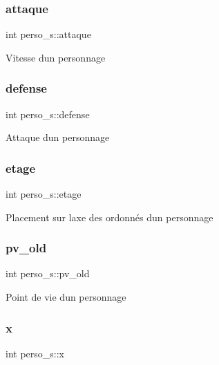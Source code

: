 \subsubsection{\texorpdfstring{attaque}{attaque}}
{\footnotesize\ttfamily int perso\+\_\+s\+::attaque}

Vitesse d\textquotesingle{}un personnage \mbox{\label{structperso__s_a5b94d67fd2b1715891d29351ba2f79c6}} 
\subsubsection{\texorpdfstring{defense}{defense}}
{\footnotesize\ttfamily int perso\+\_\+s\+::defense}

Attaque d\textquotesingle{}un personnage \mbox{\label{structperso__s_a833e982a2a21762795c06ebbc0061f32}} 
\subsubsection{\texorpdfstring{etage}{etage}}
{\footnotesize\ttfamily int perso\+\_\+s\+::etage}

Placement sur l\textquotesingle{}axe des ordonnés d\textquotesingle{}un personnage \mbox{\label{structperso__s_a297466e7436287f164f8657682eed1cc}} 
\subsubsection{\texorpdfstring{pv\+\_\+old}{pv\_old}}
{\footnotesize\ttfamily int perso\+\_\+s\+::pv\+\_\+old}

Point de vie d\textquotesingle{}un personnage \mbox{\label{structperso__s_a99f045874e46e0662e64f0525172ad4c}} 
\subsubsection{\texorpdfstring{x}{x}}
{\footnotesize\ttfamily int perso\+\_\+s\+::x}


